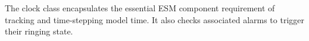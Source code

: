 
The clock class encapsulates the essential ESM component requirement of
tracking and time-stepping model time.  It also checks associated alarms to
trigger their ringing state.
